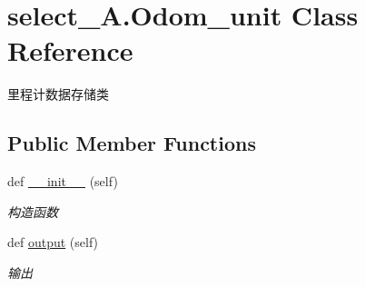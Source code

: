 \hypertarget{classselect___a_1_1_odom__unit}{}\section{select\+\_\+\+A.\+Odom\+\_\+unit Class Reference}
\label{classselect___a_1_1_odom__unit}


里程计数据存储类  


\subsection*{Public Member Functions}
\begin{DoxyCompactItemize}
\item 
def \hyperlink{classselect___a_1_1_odom__unit_afcb577ae918dd1a71159766a06631865}{\+\_\+\+\_\+init\+\_\+\+\_\+} (self)
\begin{DoxyCompactList}\small\item\em 构造函数 \end{DoxyCompactList}\item 
def \hyperlink{classselect___a_1_1_odom__unit_a04cbd6ff083372105e54a68ffadccff5}{output} (self)
\begin{DoxyCompactList}\small\item\em 输出 \end{DoxyCompactList}\end{DoxyCompactItemize}
